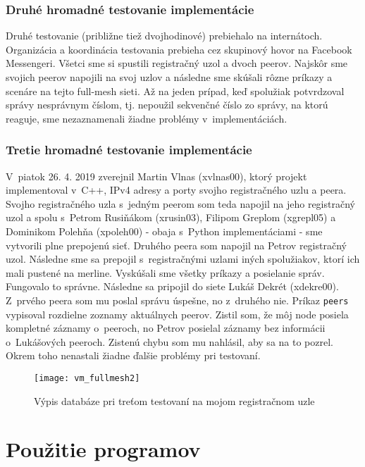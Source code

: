 \subsection{Druhé hromadné testovanie implementácie}


Druhé testovanie (približne tiež dvojhodinové) prebiehalo na internátoch. Organizácia a koordinácia testovania prebieha cez skupinový hovor na Facebook Messengeri. Všetci sme si spustili registračný uzol a dvoch peerov. Najskôr sme svojich peerov napojili na svoj uzlov a následne sme skúšali rôzne príkazy a scenáre na tejto full-mesh sieti. Až na jeden prípad, keď spolužiak potvrdzoval správy nesprávnym číslom, tj. nepoužil sekvenčné číslo zo správy, na ktorú reaguje, sme nezaznamenali žiadne problémy v~implementáciách.

\subsection{Tretie hromadné testovanie implementácie}

V~piatok 26. 4. 2019 zverejnil Martin Vlnas (xvlnas00), ktorý projekt implementoval v~C++, IPv4 adresy a porty svojho registračného uzlu a peera. Svojho registračného uzla s~jedným peerom som teda napojil na jeho registračný uzol a spolu s~Petrom Rusiňákom (xrusin03), Filipom Greplom (xgrepl05) a Dominikom Polehňa (xpoleh00) \-- obaja s~Python implementáciami \-- sme vytvorili plne prepojenú sieť. Druhého peera som napojil na Petrov registračný uzol. Následne sme sa prepojil s~registračnými uzlami iných spolužiakov, ktorí ich mali pustené na merline. Vyskúšali sme všetky príkazy a posielanie správ. Fungovalo to správne. Následne sa pripojil do siete Lukáš Dekrét (xdekre00). Z~prvého peera som mu poslal správu úspešne, no z~druhého nie. Príkaz \texttt{peers} vypisoval rozdielne zoznamy aktuálnych peerov. Zistil som, že môj node posiela kompletné záznamy o~peeroch, no Petrov posielal záznamy bez informácii o~Lukášových peeroch. Zistenú chybu som mu nahlásil, aby sa na to pozrel. Okrem toho nenastali žiadne ďalšie problémy pri testovaní.

\begin{figure}[H]
	\texttt{[image: vm\_fullmesh2]}
	\caption{Výpis databáze pri treťom testovaní na mojom registračnom uzle}
	\label{vm1}
\end{figure}


\chapter{Použitie programov}

